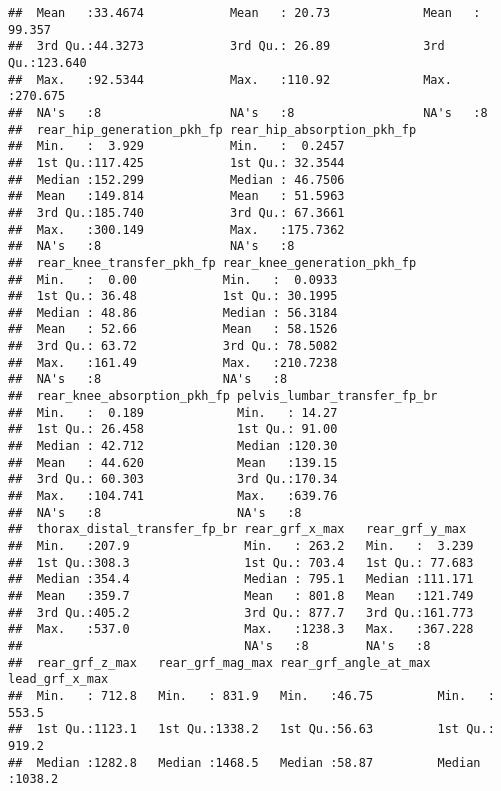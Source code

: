 \documentclass[
]{article}
\begin{document}
\begin{verbatim}
##  Mean   :33.4674            Mean   : 20.73             Mean   : 99.357         
##  3rd Qu.:44.3273            3rd Qu.: 26.89             3rd Qu.:123.640         
##  Max.   :92.5344            Max.   :110.92             Max.   :270.675         
##  NA's   :8                  NA's   :8                  NA's   :8               
##  rear_hip_generation_pkh_fp rear_hip_absorption_pkh_fp
##  Min.   :  3.929            Min.   :  0.2457          
##  1st Qu.:117.425            1st Qu.: 32.3544          
##  Median :152.299            Median : 46.7506          
##  Mean   :149.814            Mean   : 51.5963          
##  3rd Qu.:185.740            3rd Qu.: 67.3661          
##  Max.   :300.149            Max.   :175.7362          
##  NA's   :8                  NA's   :8                 
##  rear_knee_transfer_pkh_fp rear_knee_generation_pkh_fp
##  Min.   :  0.00            Min.   :  0.0933           
##  1st Qu.: 36.48            1st Qu.: 30.1995           
##  Median : 48.86            Median : 56.3184           
##  Mean   : 52.66            Mean   : 58.1526           
##  3rd Qu.: 63.72            3rd Qu.: 78.5082           
##  Max.   :161.49            Max.   :210.7238           
##  NA's   :8                 NA's   :8                  
##  rear_knee_absorption_pkh_fp pelvis_lumbar_transfer_fp_br
##  Min.   :  0.189             Min.   : 14.27              
##  1st Qu.: 26.458             1st Qu.: 91.00              
##  Median : 42.712             Median :120.30              
##  Mean   : 44.620             Mean   :139.15              
##  3rd Qu.: 60.303             3rd Qu.:170.34              
##  Max.   :104.741             Max.   :639.76              
##  NA's   :8                   NA's   :8                   
##  thorax_distal_transfer_fp_br rear_grf_x_max   rear_grf_y_max   
##  Min.   :207.9                Min.   : 263.2   Min.   :  3.239  
##  1st Qu.:308.3                1st Qu.: 703.4   1st Qu.: 77.683  
##  Median :354.4                Median : 795.1   Median :111.171  
##  Mean   :359.7                Mean   : 801.8   Mean   :121.749  
##  3rd Qu.:405.2                3rd Qu.: 877.7   3rd Qu.:161.773  
##  Max.   :537.0                Max.   :1238.3   Max.   :367.228  
##                               NA's   :8        NA's   :8        
##  rear_grf_z_max   rear_grf_mag_max rear_grf_angle_at_max lead_grf_x_max  
##  Min.   : 712.8   Min.   : 831.9   Min.   :46.75         Min.   : 553.5  
##  1st Qu.:1123.1   1st Qu.:1338.2   1st Qu.:56.63         1st Qu.: 919.2  
##  Median :1282.8   Median :1468.5   Median :58.87         Median :1038.2  

\end{verbatim}
\end{document}
